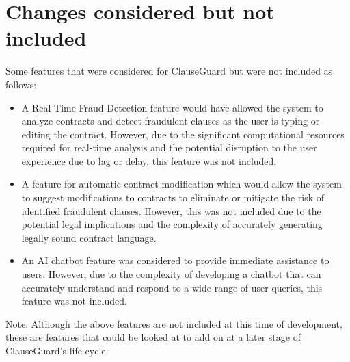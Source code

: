 \section{Changes considered but not included \label{Section::Changes considered but not included}}
Some features that were considered for ClauseGuard but were not included as follows: 
\begin{itemize}
    \item A Real-Time Fraud Detection feature would have allowed the system to analyze contracts and detect fraudulent clauses as the user is typing or editing the contract. However, due to the significant computational resources required for real-time analysis and the potential disruption to the user experience due to lag or delay, this feature was not included.
    \item A feature for automatic contract modification which would allow the system to suggest modifications to contracts to eliminate or mitigate the risk of identified fraudulent clauses. However, this was not included due to the potential legal implications and the complexity of accurately generating legally sound contract language.
    \item An AI chatbot feature was considered to provide immediate assistance to users. However, due to the complexity of developing a chatbot that can accurately understand and respond to a wide range of user queries, this feature was not included.




\end{itemize}
Note: Although the above features are not included at this time of development, these are features that could be looked at to add on at a later stage of ClauseGuard's life cycle. 

